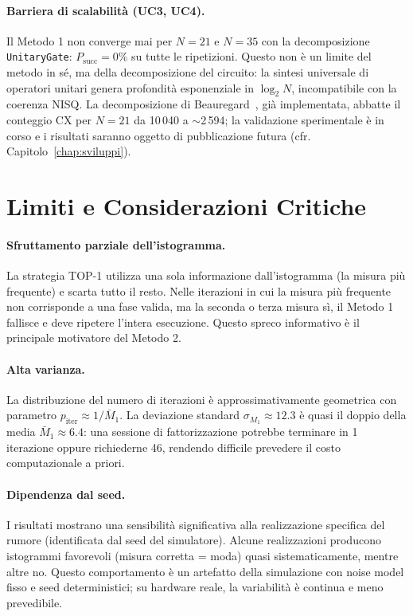 \begin{onehalfspace}
\paragraph{Barriera di scalabilità (UC3, UC4).}
Il Metodo 1 non converge mai per $N=21$ e $N=35$ con la decomposizione \texttt{UnitaryGate}: $P_{\text{succ}} = 0\%$ su tutte le ripetizioni. Questo non è un limite del metodo in sé, ma della decomposizione del circuito: la sintesi universale di operatori unitari genera profondità esponenziale in $\log_2 N$, incompatibile con la coerenza NISQ. La decomposizione di Beauregard~\cite{beauregard2002}, già implementata, abbatte il conteggio CX per $N=21$ da 10\,040 a $\sim$2\,594; la validazione sperimentale è in corso e i risultati saranno oggetto di pubblicazione futura (cfr. Capitolo~\ref{chap:sviluppi}).

\section{Limiti e Considerazioni Critiche}
\label{sec:limiti_m1}

\paragraph{Sfruttamento parziale dell'istogramma.}
La strategia TOP-1 utilizza una sola informazione dall'istogramma (la misura più frequente) e scarta tutto il resto. Nelle iterazioni in cui la misura più frequente non corrisponde a una fase valida, ma la seconda o terza misura sì, il Metodo 1 fallisce e deve ripetere l'intera esecuzione. Questo spreco informativo è il principale motivatore del Metodo 2.

\paragraph{Alta varianza.}
La distribuzione del numero di iterazioni è approssimativamente geometrica con parametro $p_{\text{iter}} \approx 1/\bar{M}_1$. La deviazione standard $\sigma_{M_1} \approx 12.3$ è quasi il doppio della media $\bar{M}_1 \approx 6.4$: una sessione di fattorizzazione potrebbe terminare in 1 iterazione oppure richiederne 46, rendendo difficile prevedere il costo computazionale a priori.

\paragraph{Dipendenza dal seed.}
I risultati mostrano una sensibilità significativa alla realizzazione specifica del rumore (identificata dal seed del simulatore). Alcune realizzazioni producono istogrammi favorevoli (misura corretta = moda) quasi sistematicamente, mentre altre no. Questo comportamento è un artefatto della simulazione con noise model fisso e seed deterministici; su hardware reale, la variabilità è continua e meno prevedibile.


\end{onehalfspace}
